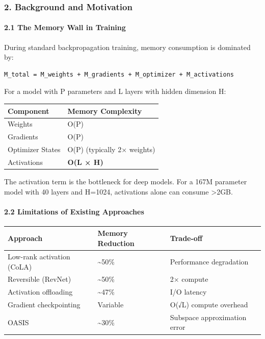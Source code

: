 \documentclass[
  11pt,
  a4paper,
]{article}
\begin{document}
\subsubsection{2. Background and
Motivation}\label{background-and-motivation}

\paragraph{2.1 The Memory Wall in
Training}\label{the-memory-wall-in-training}

During standard backpropagation training, memory consumption is
dominated by:

\begin{verbatim}
M_total = M_weights + M_gradients + M_optimizer + M_activations
\end{verbatim}

For a model with P parameters and L layers with hidden dimension H:

\begin{longtable}[]{@{}ll@{}}
\toprule\noalign{}
Component & Memory Complexity \\
\midrule\noalign{}
\endhead
\bottomrule\noalign{}
\endlastfoot
Weights & O(P) \\
Gradients & O(P) \\
Optimizer States & O(P) (typically 2× weights) \\
Activations & \textbf{O(L × H)} \\
\end{longtable}

The activation term is the bottleneck for deep models. For a 167M
parameter model with 40 layers and H=1024, activations alone can consume
\textgreater2GB.

\paragraph{2.2 Limitations of Existing
Approaches}\label{limitations-of-existing-approaches}

\begin{longtable}[]{@{}lll@{}}
\toprule\noalign{}
Approach & Memory Reduction & Trade-off \\
\midrule\noalign{}
\endhead
\bottomrule\noalign{}
\endlastfoot
Low-rank activation (CoLA) & \textasciitilde50\% & Performance
degradation \\
Reversible (RevNet) & \textasciitilde50\% & 2× compute \\
Activation offloading & \textasciitilde47\% & I/O latency \\
Gradient checkpointing & Variable & O(√L) compute overhead \\
OASIS & \textasciitilde30\% & Subspace approximation error \\
\end{longtable}
\end{document}
